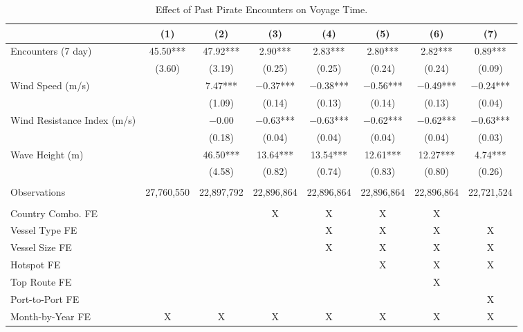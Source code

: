 \begin{table}
\centering
\caption{Effect of Past Pirate Encounters on Voyage Time. \label{tab:spec-time-table}}
\centering
\begin{adjustbox}{width = .9\textwidth}
\begin{threeparttable}
\begin{tabular}[t]{lccccccc}
\toprule
  & (1) & (2) & (3) & (4) & (5) & (6) & (7)\\
\midrule
Encounters (7 day) & \num{45.50}*** & \num{47.92}*** & \num{2.90}*** & \num{2.83}*** & \num{2.80}*** & \num{2.82}*** & \num{0.89}***\\
 & (\num{3.60}) & (\num{3.19}) & (\num{0.25}) & (\num{0.25}) & (\num{0.24}) & (\num{0.24}) & (\num{0.09})\\
Wind Speed (m/s) &  & \num{7.47}*** & \num{-0.37}*** & \num{-0.38}*** & \num{-0.56}*** & \num{-0.49}*** & \num{-0.24}***\\
 &  & (\num{1.09}) & (\num{0.14}) & (\num{0.13}) & (\num{0.14}) & (\num{0.13}) & (\num{0.04})\\
Wind Resistance Index (m/s) &  & \num{-0.00} & \num{-0.63}*** & \num{-0.63}*** & \num{-0.62}*** & \num{-0.62}*** & \num{-0.63}***\\
 &  & (\num{0.18}) & (\num{0.04}) & (\num{0.04}) & (\num{0.04}) & (\num{0.04}) & (\num{0.03})\\
Wave Height (m) &  & \num{46.50}*** & \num{13.64}*** & \num{13.54}*** & \num{12.61}*** & \num{12.27}*** & \num{4.74}***\\
 &  & (\num{4.58}) & (\num{0.82}) & (\num{0.74}) & (\num{0.83}) & (\num{0.80}) & (\num{0.26})\\
 &  &  &  &  &  &  & \\
Observations & 27,760,550 & 22,897,792 & 22,896,864 & 22,896,864 & 22,896,864 & 22,896,864 & 22,721,524\\
 &  &  &  &  &  &  & \\
Country Combo. FE &  &  & X & X & X & X & \\
Vessel Type FE &  &  &  & X & X & X & X\\
Vessel Size FE &  &  &  & X & X & X & X\\
Hotspot FE &  &  &  &  & X & X & X\\
Top Route FE &  &  &  &  &  & X & \\
Port-to-Port FE &  &  &  &  &  &  & X\\
Month-by-Year FE & X & X & X & X & X & X & X\\
\bottomrule
\end{tabular}

\end{threeparttable}
\end{adjustbox}
\end{table}
